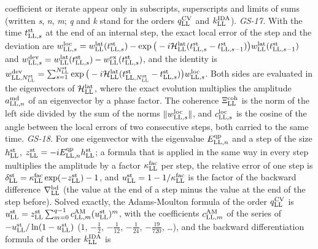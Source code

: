 \documentclass[
  10pt,
]{article}
\begin{document}
\begin{itemize}
  coefficient or iterate appear only in subscripts, superscripts and
  limits of sums (written \emph{s}, \emph{n}, \emph{m}; \emph{q} and
  \emph{k} stand for the orders \(q^{\rm CV}_{\rm LL}\) and
  \(k^{\rm IDA}_{\rm LL}\)). \emph{GS-17.} With the time
  \(t^{\rm st}_{{\rm LL},s}\) at the end of an internal step, the exact
  local error of the step and the deviation are
  \(w^{\rm loc}_{{\rm LL},s}=w^{\rm lat}_{\rm LL}(t^{\rm st}_{{\rm LL},s})-\exp\big(-i\mathcal H^{\rm lat}_{\rm LL}(t^{\rm st}_{{\rm LL},s}-t^{\rm st}_{{\rm LL},s-1})\big)w^{\rm lat}_{\rm LL}(t^{\rm st}_{{\rm LL},s-1})\)
  and
  \(w^{\rm dev}_{{\rm LL},s}=w^{\rm lat}_{\rm LL}(t^{\rm st}_{{\rm LL},s})-w^{\rm ex}_{\rm LL}(t^{\rm st}_{{\rm LL},s})\),
  and the identity is
  \(w^{\rm dev}_{{\rm LL},N^{\rm st}_{\rm LL}}=\sum_{s=1}^{N^{\rm st}_{\rm LL}}\exp\big(-i\mathcal H^{\rm lat}_{\rm LL}(t^{\rm st}_{{\rm LL},N^{\rm st}_{\rm LL}}-t^{\rm st}_{{\rm LL},s})\big)w^{\rm loc}_{{\rm LL},s}\).
  Both sides are evaluated in the eigenvectors of
  \(\mathcal H^{\rm lat}_{\rm LL}\), where the exact evolution
  multiplies the amplitude \(a^{\rm md}_{{\rm LL},n}\) of an eigenvector
  by a phase factor. The coherence \(\Xi^{\rm coh}_{\rm LL}\) is the
  norm of the left side divided by the sum of the norms
  \(\lVert w^{\rm loc}_{{\rm LL},s}\rVert\), and
  \(c^{\rm loc}_{{\rm LL},s}\) is the cosine of the angle between the
  local errors of two consecutive steps, both carried to the same time.
  \emph{GS-18.} For one eigenvector with the eigenvalue
  \(E^{\rm qp}_{{\rm LL},n}\) and a step of the size
  \(h^{\rm st}_{\rm LL}\),
  \(z^{\rm st}_{\rm LL}=-iE^{\rm qp}_{{\rm LL},n}h^{\rm st}_{\rm LL}\);
  a formula that is applied in the same way in every step multiplies the
  amplitude by a factor \(\kappa^{\rm fac}_{\rm LL}\) per step, the
  relative error of one step is
  \(\delta^{\rm st}_{\rm LL}=\kappa^{\rm fac}_{\rm LL}\exp(-z^{\rm st}_{\rm LL})-1\),
  and \(u^{\rm st}_{\rm LL}=1-1/\kappa^{\rm fac}_{\rm LL}\) is the
  factor of the backward difference \(\nabla^{\rm bd}_{\rm LL}\) (the
  value at the end of a step minus the value at the end of the step
  before). Solved exactly, the Adams-Moulton formula of the order
  \(q^{\rm CV}_{\rm LL}\) is
  \(u^{\rm st}_{\rm LL}=z^{\rm st}_{\rm LL}\sum_{m=0}^{q-1}c^{\rm AM}_{{\rm LL},m}(u^{\rm st}_{\rm LL})^m\),
  with the coefficients \(c^{\rm AM}_{{\rm LL},m}\) of the series of
  \(-u^{\rm st}_{\rm LL}/\ln(1-u^{\rm st}_{\rm LL})\) (\(1\),
  \(-\tfrac12\), \(-\tfrac1{12}\), \(-\tfrac1{24}\),
  \(-\tfrac{19}{720}\), \ldots), and the backward differentiation
  formula of the order \(k^{\rm IDA}_{\rm LL}\) is

\end{itemize}
\end{document}
